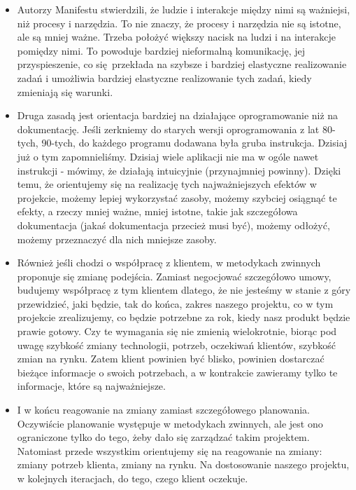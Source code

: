 \begin{itemize}
	\item Autorzy Manifestu stwierdzili, że ludzie i interakcje między nimi są ważniejsi,
	niż procesy i narzędzia. To nie znaczy, że procesy i narzędzia nie są istotne,
	ale są mniej ważne. Trzeba położyć większy nacisk na ludzi i na interakcje pomiędzy nimi.
	To powoduje bardziej nieformalną komunikację, jej przyspieszenie, co się przekłada
	na szybsze i bardziej elastyczne realizowanie zadań i umożliwia bardziej
	elastyczne realizowanie tych zadań, kiedy zmieniają się warunki.
	\item Druga zasadą jest orientacja bardziej na działające oprogramowanie niż na dokumentację.
	Jeśli zerkniemy do starych wersji oprogramowania z lat 80-tych, 90-tych,
	do każdego programu dodawana była gruba instrukcja.
	Dzisiaj już o tym zapomnieliśmy. Dzisiaj wiele aplikacji nie ma w ogóle nawet instrukcji
	- mówimy, że działają intuicyjnie (przynajmniej powinny).
	Dzięki temu, że orientujemy się na realizację tych najważniejszych efektów w projekcie,
	możemy lepiej wykorzystać zasoby, możemy szybciej osiągnąć te efekty, a rzeczy mniej ważne,
	mniej istotne, takie jak szczegółowa dokumentacja (jakaś dokumentacja przecież musi być),
	możemy odłożyć, możemy przeznaczyć dla nich mniejsze zasoby.
	\item Również jeśli chodzi o współpracę z klientem, w metodykach zwinnych
	proponuje się zmianę podejścia. Zamiast negocjować szczegółowo umowy,
	budujemy współpracę z tym klientem dlatego, że nie jesteśmy w stanie z góry przewidzieć,
	jaki będzie, tak do końca, zakres naszego projektu, co w tym projekcie zrealizujemy,
	co będzie potrzebne za rok, kiedy nasz produkt będzie prawie gotowy.
	Czy te wymagania się nie zmienią wielokrotnie, biorąc pod uwagę szybkość zmiany technologii,
	potrzeb, oczekiwań klientów, szybkość zmian na rynku. Zatem klient powinien być blisko,
	powinien dostarczać bieżące informacje o swoich potrzebach, a w kontrakcie zawieramy tylko te informacje,
	które są najważniejsze.
	\item I w końcu reagowanie na zmiany zamiast szczegółowego planowania.
	Oczywiście planowanie występuje w metodykach zwinnych, ale jest ono ograniczone tylko do tego,
	żeby dało się zarządzać takim projektem. Natomiast przede wszystkim orientujemy się na
	reagowanie na zmiany: zmiany potrzeb klienta, zmiany na rynku. Na dostosowanie naszego projektu,
	w kolejnych iteracjach, do tego, czego klient oczekuje.
\end{itemize}

